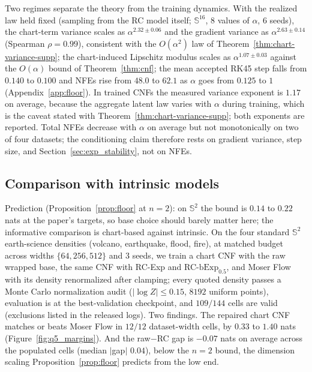 \documentclass{article}
\theoremstyle{definition}
\theoremstyle{remark}
\newcommand{\bExp}{\mathrm{bExp}}
\newcommand{\SSS}{\mathbb{S}}
\begin{document}
Two regimes separate the theory from the training dynamics. With the realized law held fixed (sampling from the RC model itself; $\SSS^{16}$, $8$ values of $\alpha$, $6$ seeds), the chart-term variance scales as $\alpha^{2.32\pm0.06}$ and the gradient variance as $\alpha^{2.63\pm0.14}$ (Spearman $\rho=0.99$), consistent with the $O(\alpha^2)$ law of Theorem~\ref{thm:chart-variance-supp}; the chart-induced Lipschitz modulus scales as $\alpha^{1.07\pm0.03}$ against the $O(\alpha)$ bound of Theorem~\ref{thm:cnf}; the mean accepted RK45 step falls from $0.140$ to $0.100$ and NFEs rise from $48.0$ to $62.1$ as $\alpha$ goes from $0.125$ to $1$ (Appendix~\ref{app:floor}). In trained CNFs the measured variance exponent is $1.17$ on average, because the aggregate latent law varies with $\alpha$ during training, which is the caveat stated with Theorem~\ref{thm:chart-variance-supp}; both exponents are reported. Total NFEs decrease with $\alpha$ on average but not monotonically on two of four datasets; the conditioning claim therefore rests on gradient variance, step size, and Section~\ref{sec:exp_stability}, not on NFEs.

\subsection{Comparison with intrinsic models}
\label{sec:exp_intrinsic}
Prediction (Proposition~\ref{prop:floor} at $n{=}2$): on $\SSS^2$ the bound is $0.14$ to $0.22$ nats at the paper's targets, so base choice should barely matter here; the informative comparison is chart-based against intrinsic. On the four standard $\SSS^2$ earth-science densities (volcano, earthquake, flood, fire), at matched budget across widths $\{64,256,512\}$ and $3$ seeds, we train a chart CNF with the raw wrapped base, the same CNF with RC-Exp and RC-$\bExp_{0.5}$, and Moser Flow \citep{rozen2021moser} with its density renormalized after clamping; every quoted density passes a Monte Carlo normalization audit ($|\log Z|\le0.15$, $8192$ uniform points), evaluation is at the best-validation checkpoint, and $109/144$ cells are valid (exclusions listed in the released logs). Two findings. The repaired chart CNF matches or beats Moser Flow in $12/12$ dataset-width cells, by $0.33$ to $1.40$ nats (Figure~\ref{fig:q5_margins}). And the raw$-$RC gap is $-0.07$ nats on average across the populated cells (median $|$gap$|$ $0.04$), below the $n{=}2$ bound, the dimension scaling Proposition~\ref{prop:floor} predicts from the low end.
\end{document}
